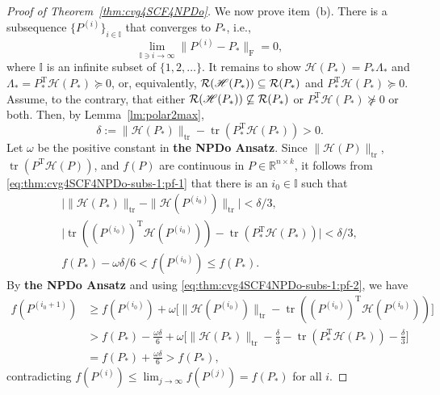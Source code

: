 \documentclass[11pt]{article}
\def\bbI{\mathbb{I}}
\def\bbR{\mathbb{R}}
\def\scrH{\mathscr{H}}
\def\cR{{\cal R}}
\DeclareMathOperator{\tr}{tr}
\DeclareMathOperator{\F}{F}
\DeclareMathOperator{\T}{T}
\theoremstyle{definition}
\numberwithin{equation}{section}
\begin{document}
\begin{proof}[Proof of Theorem~\ref{thm:cvg4SCF4NPDo}]
We now prove item~(b). There is a subsequence $\{P^{(i)}\}_{i\in\bbI}$ that converges to $P_*$, i.e.,
\begin{equation}\label{eq:thm:cvg4SCF4NPDo-subs-1:pf-1}
\lim_{\bbI\ni i\to \infty}\|P^{(i)}-P_*\|_{\F}= 0,
\end{equation}
where $\bbI$ is an infinite subset of $\{1,2,\ldots\}$.
It remains to show $\scrH(P_*)=P_*\Lambda_*$ and $\Lambda_*=P_*^{\T}\scrH(P_*)\succeq 0$, or, equivalently,
$\cR(\scrH(P_*))\subseteq\cR(P_*)$ and $P_*^{\T}\scrH(P_*)\succeq 0$.
Assume, to the contrary, that either $\cR(\scrH(P_*))\not\subseteq\cR(P_*)$ or
$P_*^{\T}\scrH(P_*)\not\succeq 0$ or both. Then, by Lemma~\ref{lm:polar2max},
$$
\delta:=\|\scrH(P_*)\|_{\tr}-\tr(P_*^{\T}\scrH(P_*))>0.
$$
Let $\omega$ be the positive constant in {\bf the NPDo Ansatz}.
Since $\|\scrH(P)\|_{\tr}$, $\tr(P^{\T}\scrH(P))$, and $f(P)$ are continuous in $P\in\bbR^{n\times k}$, it follows from
\eqref{eq:thm:cvg4SCF4NPDo-subs-1:pf-1} that there is an $i_0\in\bbI$ such that
\begin{subequations}\label{eq:thm:cvg4SCF4NPDo-subs-1:pf-2}
\begin{gather}
\Big|\|\scrH(P_*)\|_{\tr}-\|\scrH(P^{(i_0)})\|_{\tr}\Big| <\delta/3, \label{eq:thm:cvg4SCF4NPDo-subs-1:pf-2a}\\
\Big|\tr((P^{(i_0)})^{\T}\scrH(P^{(i_0)}))-\tr(P_*^{\T}\scrH(P_*))\Big|<\delta/3, \label{eq:thm:cvg4SCF4NPDo-subs-1:pf-2b}\\
f(P_*)-\omega\delta/6<f(P^{(i_0)})\le f(P_*).  \label{eq:thm:cvg4SCF4NPDo-subs-1:pf-2c}
\end{gather}
\end{subequations}
By {\bf the NPDo Ansatz} and using \eqref{eq:thm:cvg4SCF4NPDo-subs-1:pf-2}, we have
\begin{align*}
f(P^{(i_0+1)})&\ge f(P^{(i_0)})+\omega\Big[\big\|\scrH(P^{(i_0)})\big\|_{\tr}-\tr((P^{(i_0)})^{\T}\scrH(P^{(i_0)}))\Big] \\
  &>f(P_*)-\frac {\omega\delta}6+\omega\Big[\|\scrH(P_*)\|_{\tr}-\frac {\delta}3-\tr(P_*^{\T}\scrH(P_*))-\frac {\delta}3\Big] \\
  &=f(P_*)+\frac {\omega\delta}6>f(P_*),
\end{align*}
contradicting $f(P^{(i)})\le\lim_{j\to\infty}f(P^{(j)})= f(P_*)$ for all $i$.


\end{proof}
\end{document}
